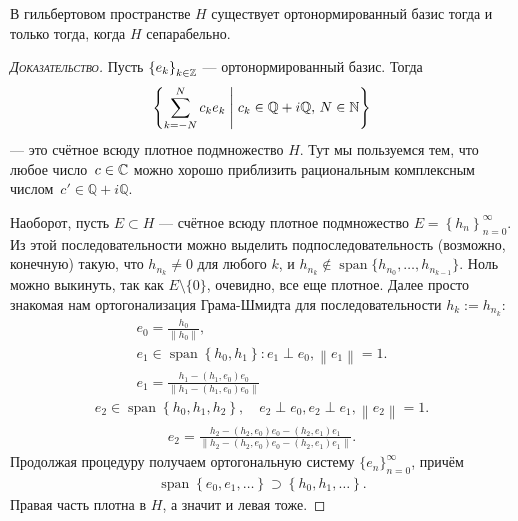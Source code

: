 \documentclass[../complex-analysis.tex]{subfiles}
\begin{document}
\begin{claim}
 В гильбертовом пространстве $ H $ существует ортонормированный базис тогда и только тогда, когда $ H $ сепарабельно.
\end{claim}
\begin{proof}[\normalfont\textsc{Доказательство}]
 Пусть $ \left\{e_k\right\}_{k \in \mathbb{Z}}  $ --- ортонормированный базис. Тогда \begin{align*}
  \left\{ \sum_{k=-N}^{N} c_ke_k \;\middle|\; c_k \in \mathbb{Q} + i\mathbb{Q},\, N \in\mathbb{N} \right\}
 \end{align*} --- это счётное всюду плотное подмножество $ H $. Тут мы пользуемся тем, что любое число~$ c \in \mathbb{C} $ можно хорошо приблизить рациональным комплексным числом~$ c' \in \mathbb{Q} + i \mathbb{Q} $.

 Наоборот, пусть $ E \subset H $ --- счётное всюду плотное подмножество $ E = \left\{ h_n \right\}_{n =0}^{\infty} $.
 Из этой последовательности можно выделить подпоследовательность (возможно, конечную) такую,
 что $ h_{n_k} \neq 0 $ для любого $ k $, и $ h_{n_k} \notin \mathop{\mathrm{span}}\{h_{n_0}, \ldots, h_{n_{k-1}}\} $. Ноль можно выкинуть, так как $ E \setminus \{0\} $,
 очевидно, все еще плотное.
 Далее просто знакомая нам ортогонализация Грама-Шмидта для последовательности $ h_k := h_{n_k} $:
 \begin{gather*}
  e_0 = \frac{h_0}{\left\| h_0 \right\|}, \\
  e_1 \in \mathop{\mathrm{span}} \left\{ h_0,h_1 \right\} \colon e_1 \perp e_0, \left\| e_1 \right\| = 1.\\
  e_1 = \frac{h_1 - (h_1, e_0)e_0}{\left\| h_1 - (h_1, e_0)e_0 \right\|}
 \end{gather*}
 \begin{align*}
  e_2 \in \mathop{\mathrm{span}} \left\{ h_0, h_1, h_2 \right\}, \quad e_2 \perp e_0, e_2 \perp e_1, \left\| e_2 \right\| = 1.
 \end{align*}
 \begin{align*}
  e_2 = \frac{h_2 - (h_2, e_0)e_0 - (h_2, e_1)e_1}{\left\| h_2 - (h_2, e_0)e_0 - (h_2, e_1)e_1  \right\|}.
 \end{align*} Продолжая процедуру получаем ортогональную систему $ \{e_{n}\}_{n=0}^{\infty}   $, причём
 \begin{align*}
  \mathop{\mathrm{span}} \left\{ e_0, e_1, \ldots \right\} \supset \left\{ h_0, h_1, \ldots \right\}.
 \end{align*} Правая часть плотна в $ H $, а значит и левая тоже.
\end{proof}
\end{document}
